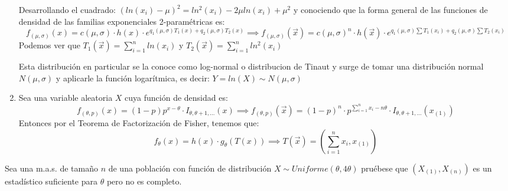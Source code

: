 \begin{sol}
\begin{enumerate}
		Desarrollando el cuadrado: $(ln(x_i) - \mu)^2 = ln^2(x_i) - 2\mu ln(x_i) + \mu^2$ y conociendo que la forma general de las funciones de densidad de las familias exponenciales 2-paramétricas es: 
		$$f_{(\mu, \sigma)}(x) = c(\mu, \sigma) \cdot h(x) \cdot e^{q_1(\mu, \sigma)T_1(x) + q_2(\mu, \sigma)T_2(x)} \implies f_{(\mu, \sigma)}(\vec{x}) = c(\mu, \sigma)^n \cdot h(\vec{x}) \cdot e^{q_1(\mu, \sigma)\sum T_1(x_i) + q_2(\mu, \sigma)\sum T_2(x_i)}$$
		Podemos ver que $T_1(\vec{x}) = \sum_{i = 1}^{n}ln(x_i)$ y $T_2(\vec{x}) = \sum_{i = 1}^{n}ln^2(x_i)$
		\begin{observación}
			Esta distribución en particular se la conoce como log-normal o distribucion de Tinaut y surge de tomar una distribución normal $N(\mu, \sigma)$ y aplicarle la función logarítmica, es decir: $Y = ln(X) \sim N(\mu, \sigma)$
		\end{observación}
		\item Sea una variable aleatoria $X$ cuya función de densidad es: 
		$$f_{(\theta, p)}(x) = (1 - p)p^{x - \theta} \cdot I_{\theta, \theta + 1, \ldots }(x) \implies f_{(\theta, p)}(\vec{x}) = (1-p)^n \cdot p^{\sum_{i = 1}^{n}x_i - n\theta} \cdot I_{\theta, \theta + 1, \ldots }(x_{(1)})$$
		Entonces por el Teorema de Factorización de Fisher, tenemos que: 
		$$ f_{\theta}(x) = h(x) \cdot g_{\theta}(T(x)) \implies T(\vec{x}) = (\sum_{i = 1}^{n}x_i, x_{(1)})$$
	\end{enumerate}
\end{sol}
\begin{problem}{2.3}
	Sea una m.a.s. de tamaño $n$ de una población con función de distribución $X \sim Uniforme(\theta, 4\theta)$ pruébese que $(X_{(1)}, X_{(n)})$ es un estadístico suficiente para $\theta$ pero no es completo. 
\end{problem}

